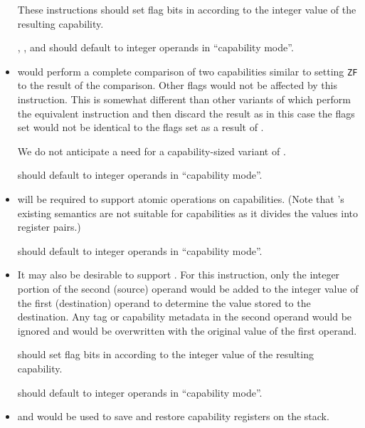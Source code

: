 \begin{itemize}
    These instructions should set flag bits in \RFLAGS{} according to
    the integer value of the resulting capability.

    , , and  should
    default to integer operands in ``capability mode''.

  \item {} would perform a complete comparison of two
    capabilities similar to  setting
    \texttt{ZF} to the result of the comparison.  Other flags would
    not be affected by this instruction.  This is somewhat different
    than other variants of  which perform the
    equivalent  instruction and then discard the
    result as in this case the flags set would not be identical to the
    flags set as a result of .

    We do not anticipate a need for a capability-sized variant of
    .

     should default to integer operands in ``capability
    mode''.

  \item {} will be required to support atomic
    operations on capabilities.  (Note that 's
    existing semantics are not suitable for capabilities as it divides
    the values into register pairs.)

     should default to integer operands in
    ``capability mode''.

  \item It may also be desirable to support .  For
    this instruction, only the integer portion of the second (source)
    operand would be added to the integer value of the first
    (destination) operand to determine the value stored to the
    destination.  Any tag or capability metadata in the second operand
    would be ignored and would be overwritten with the original value
    of the first operand.

     should set flag bits in \RFLAGS{} according to
    the integer value of the resulting capability.

     should default to integer operands in
    ``capability mode''.

  \item {} and  would be used to save
    and restore capability registers on the stack.


\end{itemize}
